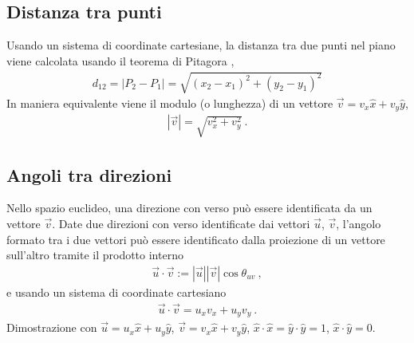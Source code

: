 \documentclass[letterpaper,10pt,english]{jupyterBook}
\begin{document}
\subsection{Distanza tra punti}
\label{\detokenize{ch/analytic_geometry/analytic_geometry_2d/points:distanza-tra-punti}}
\sphinxAtStartPar
Usando un sistema di coordinate cartesiane, la distanza tra due punti nel piano viene calcolata usando il teorema di Pitagora ,
\begin{equation*}
\begin{split}d_{12} = |P_2 - P_1| = \sqrt{(x_2 - x_1)^2 + (y_2 - y_1)^2}\end{split}
\end{equation*}
\sphinxAtStartPar
In maniera equivalente viene il modulo (o lunghezza) di un vettore \(\vec{v} = v_x \hat{x} + v_y \hat{y}\),
\begin{equation*}
\begin{split}|\vec{v}| = \sqrt{v_x^2 + v_y^2} \ .\end{split}
\end{equation*}

\subsection{Angoli tra direzioni}
\label{\detokenize{ch/analytic_geometry/analytic_geometry_2d/points:angoli-tra-direzioni}}
\sphinxAtStartPar
Nello spazio euclideo, una direzione con verso può essere identificata da un vettore \(\vec{v}\). Date due direzioni con verso identificate dai vettori \(\vec{u}\), \(\vec{v}\), l’angolo formato tra i due vettori può essere identificato dalla proiezione di un vettore sull’altro tramite il prodotto interno
\begin{equation*}
\begin{split}\vec{u} \cdot \vec{v} := |\vec{u}| |\vec{v}| \cos \theta_{uv} \ ,\end{split}
\end{equation*}
\sphinxAtStartPar
e usando un sistema di coordinate cartesiano
\begin{equation*}
\begin{split}\vec{u} \cdot \vec{v} = u_x v_x + u_y v_y \ .\end{split}
\end{equation*}
\sphinxAtStartPar
{} Dimostrazione con \(\vec{u} = u_x \hat{x} + u_y \hat{y}\), \(\vec{v} = v_x \hat{x} + v_y \hat{y}\), \(\hat{x} \cdot \hat{x} = \hat{y} \cdot \hat{y} = 1\), \(\hat{x} \cdot \hat{y} = 0\).
\end{document}
